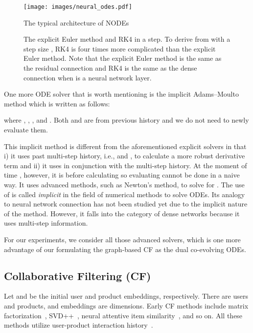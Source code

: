 \documentclass[sigconf]{acmart}
\begin{document}
\begin{figure}[!t]
\centering
\texttt{[image: images/neural\_odes.pdf]}
\caption{The typical architecture of NODEs}\label{fig:archi2}
\end{figure}

\begin{figure}[!t]
\centering
{}
\caption{The explicit Euler method and RK4 in a step. To derive  from  with a step size , RK4 is four times more complicated than the explicit Euler method. Note that the explicit Euler method is the same as the residual connection and RK4 is the same as the dense connection when  is a neural network layer.}\label{fig:solvers}
\end{figure}

One more ODE solver that is worth mentioning is the implicit Adams–Moulto method which is written as follows:
\begin{linenomath*}\end{linenomath*}where , , , and . Both  and  are from previous history and we do not need to newly evaluate them.


This implicit method is different from the aforementioned explicit solvers in that i) it uses past multi-step history, i.e.,  and , to calculate a more robust derivative term and ii) it uses  in conjunction with the multi-step history. At the moment of time , however, it is before calculating  so evaluating  cannot be done in a naive way. It uses advanced methods, such as Newton's method, to solve for . The use of  is called \emph{implicit} in the field of numerical methods to solve ODEs. Its analogy to neural network connection has not been studied yet due to the implicit nature of the method. However, it falls into the category of dense networks because it uses multi-step information.

For our experiments, we consider all those advanced solvers, which is one more advantage of our formulating the graph-based CF as the dual co-evolving ODEs.



\subsection{Collaborative Filtering (CF)} Let  and  be the initial user and product embeddings, respectively. There are  users and  products, and embeddings are  dimensions. Early CF methods include matrix factorization~\cite{5197422}, SVD++~\cite{10.1145/1401890.1401944}, neural attentive item similarity~\cite{8352808}, and so on. All these methods utilize user-product interaction history~\cite{10.1145/3285029}.
\end{document}
